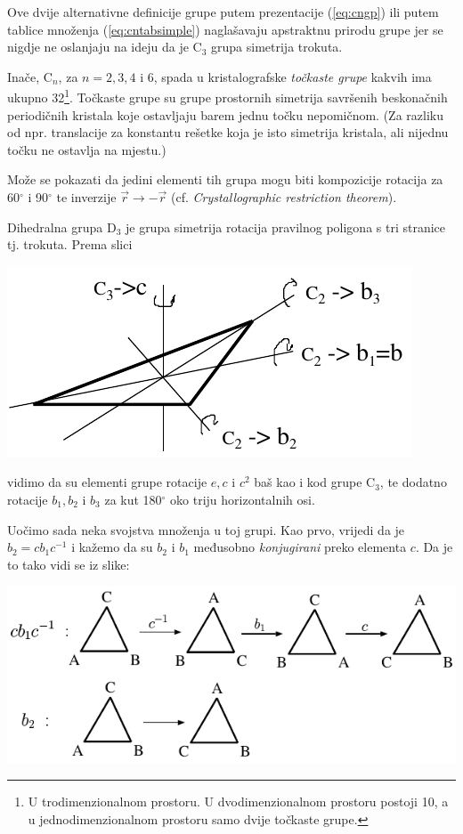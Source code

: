Ove dvije alternativne definicije grupe putem prezentacije (\ref{eq:cngp}) ili
putem tablice množenja (\ref{eq:cntabsimple}) 
naglašavaju apstraktnu prirodu grupe jer se nigdje ne oslanjaju
na ideju da je C$_3$ grupa simetrija trokuta.

Inače, C$_n$, za $n=2,3,4$ i $6$, spada u kristalografske \emph{točkaste grupe} kakvih
ima ukupno 32\footnote{U trodimenzionalnom prostoru. U dvodimenzionalnom prostoru postoji 10, a u
jednodimenzionalnom prostoru samo dvije točkaste grupe.}. 
Točkaste grupe su grupe prostornih simetrija savršenih beskonačnih
periodičnih kristala koje ostavljaju barem jednu točku nepomičnom. (Za
razliku od npr. translacije za konstantu rešetke koja je isto simetrija
kristala, ali nijednu točku ne ostavlja na mjestu.)
  
Može se pokazati da jedini elementi tih grupa mogu biti kompozicije
rotacija za 60$^\circ$ i 90$^\circ$ te inverzije $\vec{r}\to -\vec{r}$
(cf. \emph{Crystallographic restriction theorem}).
   

\begin{primjer}
    Dihedralna grupa $\mathrm{D}_3$ je grupa simetrija rotacija pravilnog poligona s tri
    stranice tj. trokuta.  Prema slici
    \begin{center}
    \includegraphics[scale=1.0]{pics/D3}
    \end{center}
vidimo da su elementi grupe rotacije $e, c$ i  $c^2$ baš kao i kod grupe $\mathrm{C}_3$, te
dodatno rotacije $b_1, b_2$ i $b_3$ za kut 180$^\circ$ oko triju horizontalnih
osi.
\end{primjer}

Uočimo sada neka svojstva množenja u toj grupi. Kao prvo, vrijedi
da je $b_2 = c b_1 c^{-1}$ i kažemo da su $b_2$ i $b_1$ međusobno
\emph{konjugirani} preko elementa $c$. Da je to tako vidi
se iz slike:

\centerline{\includegraphics[scale=1.0]{pics/cbc}}

